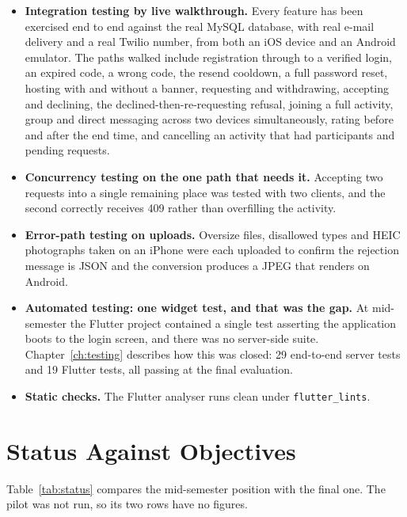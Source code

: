 \documentclass{tietreport}
\begin{document}
\begin{itemize}
  \item \textbf{Integration testing by live walkthrough.} Every feature has been
        exercised end to end against the real MySQL database, with real e-mail delivery
        and a real Twilio number, from both an iOS device and an Android emulator. The
        paths walked include registration through to a verified login, an expired code,
        a wrong code, the resend cooldown, a full password reset, hosting with and
        without a banner, requesting and withdrawing, accepting and declining, the
        declined-then-re-requesting refusal, joining a full activity, group and direct
        messaging across two devices simultaneously, rating before and after the end
        time, and cancelling an activity that had participants and pending requests.

  \item \textbf{Concurrency testing on the one path that needs it.} Accepting two
        requests into a single remaining place was tested with two clients, and the
        second correctly receives 409 rather than overfilling the activity.

  \item \textbf{Error-path testing on uploads.} Oversize files, disallowed types and
        HEIC photographs taken on an iPhone were each uploaded to confirm the rejection
        message is JSON and the conversion produces a JPEG that renders on Android.

  \item \textbf{Automated testing: one widget test, and that was the gap.} At
        mid-semester the Flutter project contained a single test asserting the
        application boots to the login screen, and there was no server-side suite.
        Chapter~\ref{ch:testing} describes how this was closed: 29 end-to-end server
        tests and 19 Flutter tests, all passing at the final evaluation.

  \item \textbf{Static checks.} The Flutter analyser runs clean under
        \texttt{flutter\_lints}.
\end{itemize}

\section{Status Against Objectives}

Table~\ref{tab:status} compares the mid-semester position with the final one. The pilot
was not run, so its two rows have no figures.
\end{document}
